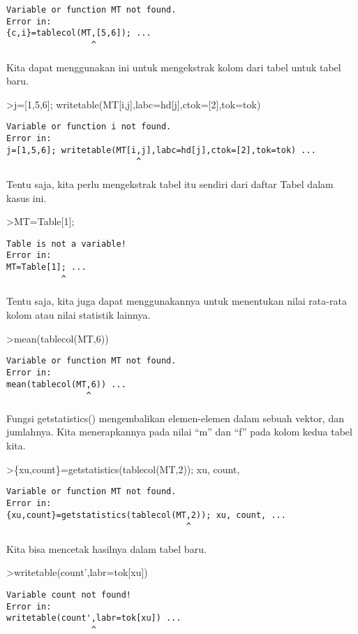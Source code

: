 \documentclass[
]{book}
\begin{document}
\begin{verbatim}
Variable or function MT not found.
Error in:
{c,i}=tablecol(MT,[5,6]); ...
                 ^
\end{verbatim}

Kita dapat menggunakan ini untuk mengekstrak kolom dari tabel untuk tabel baru.

\textgreater j={[}1,5,6{]}; writetable(MT{[}i,j{]},labc=hd{[}j{]},ctok={[}2{]},tok=tok)

\begin{verbatim}
Variable or function i not found.
Error in:
j=[1,5,6]; writetable(MT[i,j],labc=hd[j],ctok=[2],tok=tok) ...
                          ^
\end{verbatim}

Tentu saja, kita perlu mengekstrak tabel itu sendiri dari daftar Tabel dalam kasus ini.

\textgreater MT=Table{[}1{]};

\begin{verbatim}
Table is not a variable!
Error in:
MT=Table[1]; ...
           ^
\end{verbatim}

Tentu saja, kita juga dapat menggunakannya untuk menentukan nilai rata-rata kolom atau nilai statistik lainnya.

\textgreater mean(tablecol(MT,6))

\begin{verbatim}
Variable or function MT not found.
Error in:
mean(tablecol(MT,6)) ...
                ^
\end{verbatim}

Fungsi getstatistics() mengembalikan elemen-elemen dalam sebuah vektor, dan jumlahnya. Kita menerapkannya pada nilai ``m'' dan ``f'' pada kolom kedua tabel kita.

\textgreater\{xu,count\}=getstatistics(tablecol(MT,2)); xu, count,

\begin{verbatim}
Variable or function MT not found.
Error in:
{xu,count}=getstatistics(tablecol(MT,2)); xu, count, ...
                                    ^
\end{verbatim}

Kita bisa mencetak hasilnya dalam tabel baru.

\textgreater writetable(count',labr=tok{[}xu{]})

\begin{verbatim}
Variable count not found!
Error in:
writetable(count',labr=tok[xu]) ...
                 ^
\end{verbatim}
\end{document}
